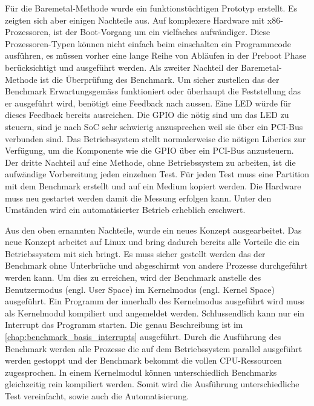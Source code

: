 Für die Baremetal-Methode wurde ein funktionstüchtigen Prototyp erstellt. Es zeigten sich aber einigen Nachteile aus. Auf komplexere Hardware mit x86-Prozessoren, ist der Boot-Vorgang um ein vielfaches aufwändiger\cite{intel_boot_process}. Diese Prozessoren-Typen können nicht einfach beim einschalten ein Programmcode ausführen, es müssen vorher eine lange Reihe von Abläufen in der Preboot Phase berücksichtigt und ausgeführt werden. Als zweiter Nachteil der Baremetal-Methode ist die Überprüfung des Benchmark. Um sicher zustellen das der Benchmark Erwartungsgemäss funktioniert oder überhaupt die Feststellung das er ausgeführt wird, benötigt eine Feedback nach aussen. Eine LED würde für dieses Feedback bereits ausreichen. Die GPIO die nötig sind um das LED zu steuern, sind je nach SoC sehr schwierig anzusprechen weil sie über ein PCI-Bus verbunden sind. Das Betriebssystem stellt normalerweise die nötigen Liberies zur Verfügung, um die Komponente wie die GPIO über ein PCI-Bus anzusteuern. Der dritte Nachteil auf eine Methode, ohne Betriebssystem zu arbeiten, ist die aufwändige Vorbereitung jeden einzelnen Test. Für jeden Test muss eine Partition mit dem Benchmark erstellt und auf ein Medium kopiert werden. Die Hardware muss neu gestartet werden
damit die Messung erfolgen kann. Unter den Umständen wird ein automatisierter Betrieb erheblich erschwert.
\par
Aus den oben ernannten Nachteile, wurde ein neues Konzept ausgearbeitet. Das neue Konzept arbeitet auf Linux und bring dadurch bereits alle Vorteile die ein Betriebssystem mit sich bringt. Es muss sicher gestellt werden das der Benchmark ohne Unterbrüche und abgeschirmt von andere Prozesse durchgeführt werden kann. Um dies zu erreichen, wird der Benchmark anstelle des Benutzermodus (engl. User Space) im Kernelmodus (engl. Kernel Space) ausgeführt\cite{Mandl2010}. Ein Programm der innerhalb des Kernelmodus ausgeführt wird muss als Kernelmodul kompiliert und angemeldet werden. Schlussendlich kann nur ein Interrupt das Programm starten. Die genau Beschreibung ist im \autoref{chap:benchmark_basis_interrupts} ausgeführt. Durch die Ausführung des Benchmark werden alle Prozesse die auf dem Betriebssystem parallel ausgeführt werden gestoppt und der Benchmark bekommt die vollen CPU-Ressourcen zugesprochen. In einem Kernelmodul können unterschiedlich Benchmarks gleichzeitig rein kompiliert werden. Somit wird die Ausführung unterschiedliche Test vereinfacht, sowie auch die Automatisierung.

 



 
